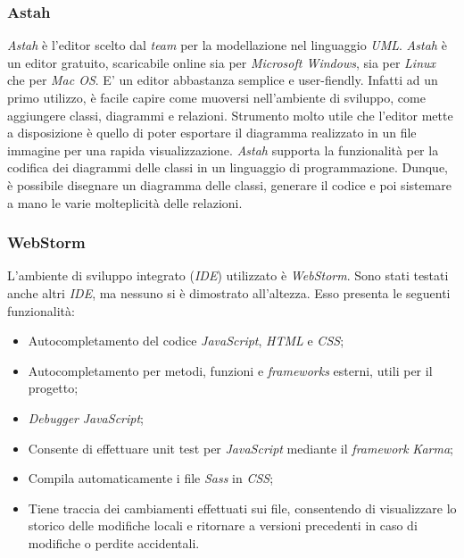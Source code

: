 \subsubsection{Astah}
\textit{Astah} è l'editor scelto dal \textit{team} per la modellazione nel linguaggio \textit{UML}.
\textit{Astah} è un editor gratuito, scaricabile online sia per \textit{Microsoft Windows}, sia per \textit{Linux} che per \textit{Mac OS}.
E' un editor abbastanza semplice e user-fiendly. Infatti ad un  primo utilizzo, è facile capire come muoversi nell'ambiente di sviluppo, come aggiungere classi, diagrammi e relazioni.
Strumento molto utile che l'editor mette a disposizione è quello di poter esportare il diagramma realizzato in un file immagine per una rapida visualizzazione.
\textit{Astah} supporta la funzionalità per la codifica dei diagrammi delle classi in un linguaggio di programmazione. Dunque, è possibile disegnare un diagramma delle classi, generare il codice e poi sistemare a mano le varie molteplicità delle relazioni.



\subsubsection{WebStorm}
L'ambiente di sviluppo integrato (\textit{IDE}) utilizzato è \textit{WebStorm}. Sono stati testati anche altri \textit{IDE}, ma nessuno si è dimostrato all'altezza. Esso presenta le seguenti funzionalità:
\begin{itemize}
\item
Autocompletamento del codice \textit{JavaScript}, \textit{HTML} e \textit{CSS};
\item
Autocompletamento per metodi, funzioni e \textit{frameworks} esterni, utili per il progetto;
\item
\textit{Debugger} \textit{JavaScript};
\item
Consente di effettuare unit test per \textit{JavaScript} mediante il \textit{framework} \textit{Karma};
\item
Compila automaticamente i file \textit{Sass} in \textit{CSS};
\item
Tiene traccia dei cambiamenti effettuati sui file, consentendo di visualizzare lo storico delle modifiche locali e ritornare a versioni precedenti in caso di modifiche o perdite accidentali.
\end{itemize}


